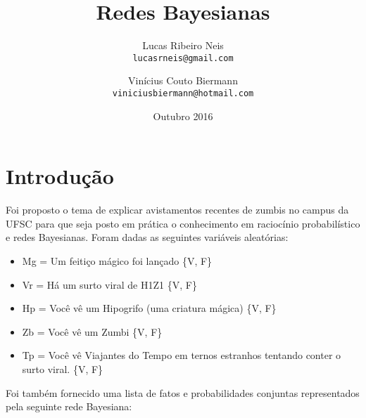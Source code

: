 \documentclass{article}
\begin{document}
\title{\textbf{Redes Bayesianas}}
\author{
    Lucas Ribeiro Neis\\
     {\texttt{lucasrneis@gmail.com}}
     \and
     Vinícius Couto Biermann\\
      {\texttt{viniciusbiermann@hotmail.com}}
      \vspace{-50mm}
}
\date{Outubro 2016}

\maketitle

\section{Introdução}

Foi proposto o tema de explicar avistamentos recentes de zumbis no campus da UFSC para que seja posto em prática o conhecimento em raciocínio probabilístico e redes Bayesianas. Foram dadas as seguintes variáveis aleatórias:

\begin{itemize}
    \item Mg = Um feitiço mágico foi lançado \{V, F\}
    \item Vr = Há um surto viral de H1Z1 \{V, F\}
    \item Hp = Você vê um Hipogrifo (uma criatura mágica) \{V, F\}
    \item Zb = Você vê um Zumbi \{V, F\}
    \item Tp = Você vê Viajantes do Tempo em ternos estranhos tentando conter o surto viral. \{V, F\}
\end{itemize}

Foi também fornecido uma lista de fatos e probabilidades conjuntas representados pela seguinte rede Bayesiana:
\end{document}
